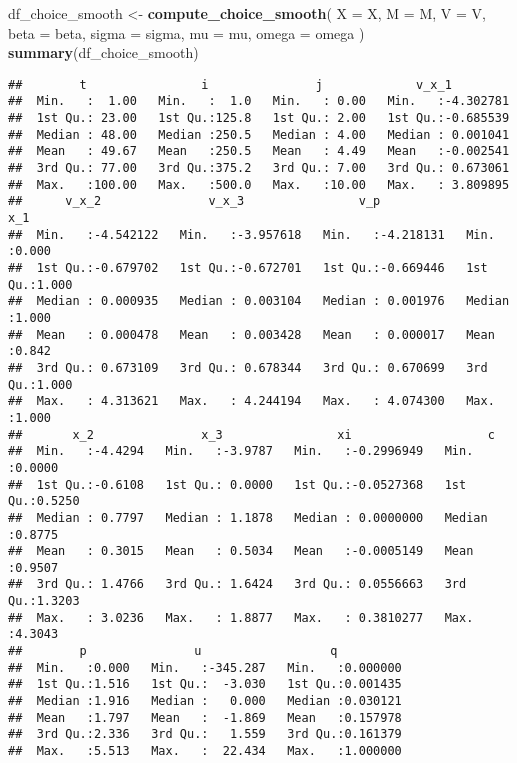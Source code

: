\documentclass[
]{book}
\newenvironment{Shaded}{\begin{snugshade}}{\end{snugshade}}
\newcommand{\AttributeTok}[1]{\textcolor[rgb]{0.13,0.29,0.53}{#1}}
\newcommand{\FunctionTok}[1]{\textcolor[rgb]{0.13,0.29,0.53}{\textbf{#1}}}
\newcommand{\NormalTok}[1]{#1}
\newcommand{\OtherTok}[1]{\textcolor[rgb]{0.56,0.35,0.01}{#1}}
\begin{document}
\begin{Shaded}
\begin{Highlighting}[]
\NormalTok{df\_choice\_smooth }\OtherTok{\textless{}{-}}
  \FunctionTok{compute\_choice\_smooth}\NormalTok{(}
    \AttributeTok{X =}\NormalTok{ X, }
    \AttributeTok{M =}\NormalTok{ M, }
    \AttributeTok{V =}\NormalTok{ V, }
    \AttributeTok{beta =}\NormalTok{ beta, }
    \AttributeTok{sigma =}\NormalTok{ sigma, }
    \AttributeTok{mu =}\NormalTok{ mu, }
    \AttributeTok{omega =}\NormalTok{ omega}
\NormalTok{    )}
\FunctionTok{summary}\NormalTok{(df\_choice\_smooth)}
\end{Highlighting}
\end{Shaded}

\begin{verbatim}
##        t                i               j             v_x_1          
##  Min.   :  1.00   Min.   :  1.0   Min.   : 0.00   Min.   :-4.302781  
##  1st Qu.: 23.00   1st Qu.:125.8   1st Qu.: 2.00   1st Qu.:-0.685539  
##  Median : 48.00   Median :250.5   Median : 4.00   Median : 0.001041  
##  Mean   : 49.67   Mean   :250.5   Mean   : 4.49   Mean   :-0.002541  
##  3rd Qu.: 77.00   3rd Qu.:375.2   3rd Qu.: 7.00   3rd Qu.: 0.673061  
##  Max.   :100.00   Max.   :500.0   Max.   :10.00   Max.   : 3.809895  
##      v_x_2               v_x_3                v_p                 x_1       
##  Min.   :-4.542122   Min.   :-3.957618   Min.   :-4.218131   Min.   :0.000  
##  1st Qu.:-0.679702   1st Qu.:-0.672701   1st Qu.:-0.669446   1st Qu.:1.000  
##  Median : 0.000935   Median : 0.003104   Median : 0.001976   Median :1.000  
##  Mean   : 0.000478   Mean   : 0.003428   Mean   : 0.000017   Mean   :0.842  
##  3rd Qu.: 0.673109   3rd Qu.: 0.678344   3rd Qu.: 0.670699   3rd Qu.:1.000  
##  Max.   : 4.313621   Max.   : 4.244194   Max.   : 4.074300   Max.   :1.000  
##       x_2               x_3                xi                   c         
##  Min.   :-4.4294   Min.   :-3.9787   Min.   :-0.2996949   Min.   :0.0000  
##  1st Qu.:-0.6108   1st Qu.: 0.0000   1st Qu.:-0.0527368   1st Qu.:0.5250  
##  Median : 0.7797   Median : 1.1878   Median : 0.0000000   Median :0.8775  
##  Mean   : 0.3015   Mean   : 0.5034   Mean   :-0.0005149   Mean   :0.9507  
##  3rd Qu.: 1.4766   3rd Qu.: 1.6424   3rd Qu.: 0.0556663   3rd Qu.:1.3203  
##  Max.   : 3.0236   Max.   : 1.8877   Max.   : 0.3810277   Max.   :4.3043  
##        p               u                  q           
##  Min.   :0.000   Min.   :-345.287   Min.   :0.000000  
##  1st Qu.:1.516   1st Qu.:  -3.030   1st Qu.:0.001435  
##  Median :1.916   Median :   0.000   Median :0.030121  
##  Mean   :1.797   Mean   :  -1.869   Mean   :0.157978  
##  3rd Qu.:2.336   3rd Qu.:   1.559   3rd Qu.:0.161379  
##  Max.   :5.513   Max.   :  22.434   Max.   :1.000000
\end{verbatim}
\end{document}

